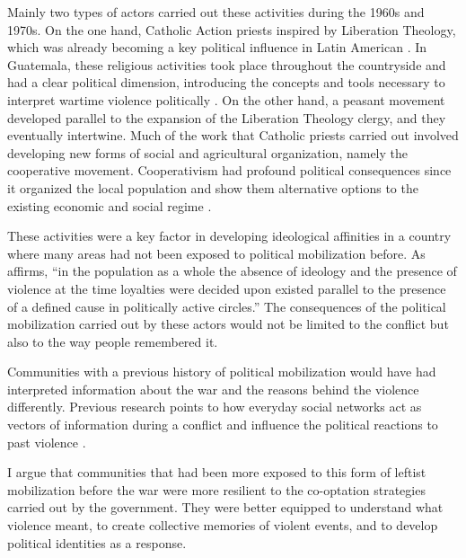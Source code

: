 \documentclass[12pt, notitlepage]{article}
\begin{document}
Mainly two types of actors carried out these activities during the 1960s and 1970s.
On the one hand, Catholic Action priests inspired by Liberation Theology, which was already becoming a key political influence in Latin American \citep[e.g.][]{Wood:2003aa}.
In Guatemala, these religious activities took place throughout the countryside and had a clear political dimension, introducing the concepts and tools necessary to interpret wartime violence politically \citep{Carmack:1988aa, Manz:1988aa, Manz:2004aa, LeBot:1992aa, Bateson:2013aa}.
On the other hand, a peasant movement developed parallel to the expansion of the Liberation Theology clergy, and they eventually intertwine.
Much of the work that Catholic priests carried out involved developing new forms of social and agricultural organization, namely the cooperative movement.
Cooperativism had profound political consequences since it organized the local population and show them alternative options to the existing economic and social regime \citep{Arias:1992aa, Nelson:2009aa, Bateson:2013aa}.

These activities were a key factor in developing ideological affinities in a country where many areas had not been exposed to political mobilization before.
As \citet[84]{Lofving:2005aa} affirms, ``in the population as a whole the absence of ideology and the presence of violence at the time loyalties were decided upon existed parallel to the presence of a defined cause in politically active circles.''
The consequences of the political mobilization carried out by these actors would not be limited to the conflict but also to the way people remembered it.

Communities with a previous history of political mobilization would have had interpreted information about the war and the reasons behind the violence differently.
Previous research points to how everyday social networks act as vectors of information during a conflict \citep{Shesterinina:2016aa} and influence the political reactions to past violence \citep{Rydgren:2007aa, Dorff:2017aa}.

I argue that communities that had been more exposed to this form of leftist mobilization before the war were more resilient to the co-optation strategies carried out by the government.
They were better equipped to understand what violence meant, to create collective memories of violent events, and to develop political identities as a response.
\end{document}
